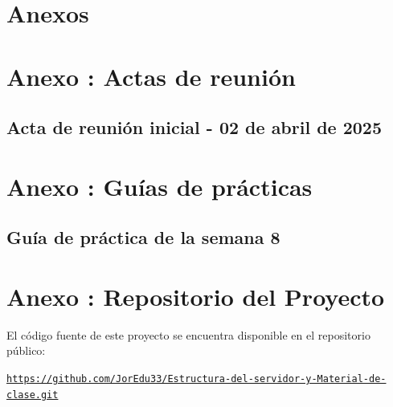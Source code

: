 \documentclass[letter,oneside,12pt,spanish]{report}
\begin{document}
\appendix

\chapter*{Anexos}

\chapter*{Anexo \thechapter: Actas de reunión}
\label{anexo:actas}

\section*{Acta de reunión inicial - 02 de abril de 2025}
\label{anexo:acta-abril-2025}



\chapter*{Anexo \thechapter: Guías de prácticas}
\label{anexo:Guía Semana 8}

\section*{Guía de práctica de la semana 8}
\label{anexo:Guía-Semana-8}



\chapter*{Anexo \thechapter: Repositorio del Proyecto}
\label{anexo:repositorio}

El código fuente de este proyecto se encuentra disponible en el repositorio público:

\begin{center}
\href{https://github.com/JorEdu33/Estructura-del-servidor-y-Material-de-clase.git}{\texttt{https://github.com/JorEdu33/Estructura-del-servidor-y-Material-de-clase.git}}
\end{center}




\end{document}
